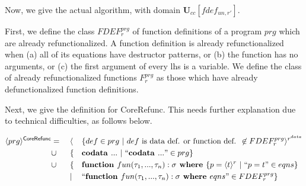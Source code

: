 Now, we give the actual algorithm, with domain $\mathbf{U}_{cc}[fdef_{un,r'}]$.

\begin{algorithm}

First, we define the class $FDEF^{prg}_r$ of function definitions of a program $prg$ which are already refunctionalized. A function definition is already refunctionalized when (a) all of its equations have destructor patterns, or (b) the function has no arguments, or (c) the first argument of every lhs is a variable. We define the class of already refunctionalized functions $F^{prg}_r$ as those which have already defunctionalized function definitions.

Next, we give the definition for \textsf{CoreRefunc}. This needs further explanation due to technical difficulties, as follows below.

\begin{alignat*}{3}
\langle prg \rangle^{\textsf{CoreRefunc}} & = ~&& \langle && \{ def \in prg ~ | ~ def \textrm{ is data def. or function def. } \not\in FDEF^{prg}_r \rangle^{r^{data}} \\
& \cup && \{ && \textrm{\textbf{codata }} ... ~ | ~ `` \textrm{\textbf{codata }} ... " \in prg \} \\
& \cup && \{ && \textrm{\textbf{function }} fun(\tau_1, ..., \tau_n): \sigma \textrm{\textbf{ where }} \{ p = \langle t \rangle^r ~ | ~ ``p = t" \in eqns \} \\
& && | && `` \textrm{\textbf{function }} fun(\tau_1, ..., \tau_n): \sigma \textrm{\textbf{ where }} eqns " \in FDEF^{prg}_r \} 
\end{alignat*}


\end{algorithm}
